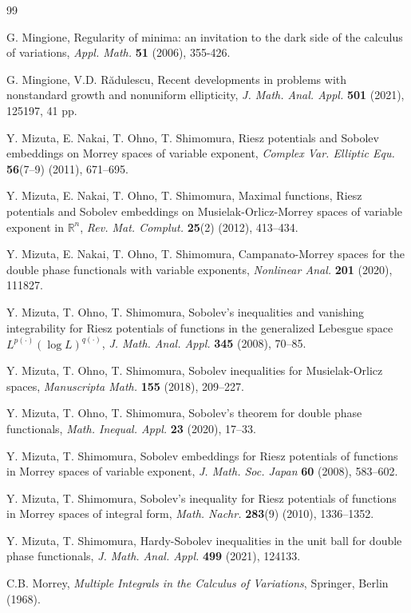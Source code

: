 \documentclass[10pt,reqno]{amsart}
\newcommand *\w{^\wedge}
\theoremstyle{definition}
\numberwithin{equation}{section}
\begin{document}
\begin{thebibliography}{99}
{
G. Mingione,
Regularity of minima: an invitation to the dark side of the calculus of variations,
{\it Appl. Math.} \textbf{51} (2006), 355-426.

G. Mingione, V.D. R\u{a}dulescu, 
Recent developments in problems with nonstandard growth and nonuniform ellipticity, 
{\it J. Math. Anal. Appl.} \textbf{501} (2021), 125197, 41 pp.


Y. Mizuta, E. Nakai, T. Ohno, T. Shimomura, 
Riesz potentials and Sobolev embeddings on Morrey spaces of variable exponent, 
{\it Complex Var. Elliptic Equ.} \textbf{56}(7–9) (2011), 671–695.

Y. Mizuta, E. Nakai, T. Ohno, T. Shimomura, 
Maximal functions, Riesz potentials and Sobolev embeddings on Musielak-Orlicz-Morrey spaces of variable exponent in $\mathbb{R}^n$, 
{\it Rev. Mat. Complut.} \textbf{25}(2) (2012), 413–434.

Y. Mizuta, E. Nakai, T. Ohno, T. Shimomura, 
Campanato-Morrey spaces for the double phase functionals with variable exponents, 
{\it Nonlinear Anal.} \textbf{201} (2020), 111827.

Y. Mizuta, T. Ohno, T. Shimomura, 
Sobolev's inequalities and vanishing integrability for Riesz potentials of functions in the generalized Lebesgue space $L^{p(\cdot)}(\log L)^{q(\cdot)}$, 
{\it J. Math. Anal. Appl.} \textbf{345} (2008), 70–85.

Y. Mizuta, T. Ohno, T. Shimomura, 
Sobolev inequalities for Musielak-Orlicz spaces, 
{\it Manuscripta Math.} \textbf{155} (2018), 209–227.

Y. Mizuta, T. Ohno, T. Shimomura, 
Sobolev's theorem for double phase functionals, 
{\it Math. Inequal. Appl.} \textbf{23} (2020), 17–33.

Y. Mizuta, T. Shimomura, 
Sobolev embeddings for Riesz potentials of functions in Morrey spaces of variable exponent, 
{\it J. Math. Soc. Japan} \textbf{60} (2008), 583–602.

Y. Mizuta, T. Shimomura, 
Sobolev's inequality for Riesz potentials of functions in Morrey spaces of integral form, 
{\it Math. Nachr.} \textbf{283}(9) (2010), 1336–1352.

Y. Mizuta, T. Shimomura, 
Hardy-Sobolev inequalities in the unit ball for double phase functionals, 
{\it J. Math. Anal. Appl.} \textbf{499} (2021), 124133.

C.B. Morrey, 
{\it Multiple Integrals in the Calculus of Variations}, 
Springer, Berlin (1968).

}
\end{thebibliography}
\end{document}
